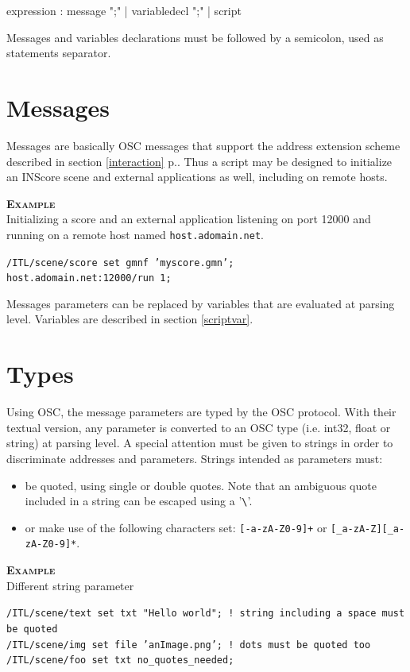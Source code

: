 \documentclass[a4paper,twoside]{report}
\newcommand{\sublevel}[1]	{\section{#1}}
\newcommand{\fullref}[1]	{\ref{#1} p.\pageref{#1}}
\newcommand{\OSC}[1]		{\texttt{#1}}
\newcommand{\example}		{\textbf{\hspace{-1.5cm}\textbf{\textsc{Example }}}}
\newcommand{\sample}	[1]			{\vspace{-2mm}\begin{center}\colorbox{mygrey}{
								\begin{minipage}[t]{0.9\columnwidth} 
								{\small \texttt{#1}}
								\end{minipage}}\end{center}}
\begin{document}
\begin{rail}
expression :  
		 	message ";"
		| 	variabledecl ";"
		| 	script
\end{rail}

Messages and variables declarations must be followed by a semicolon, used as statements separator.

\sublevel{Messages}\label{scriptmsgs}

Messages are basically OSC messages that support the address extension scheme described in section \fullref{interaction}.
Thus a script may be designed to initialize an INScore scene and external applications as well, including on remote hosts.

\example\\
Initializing a score and an external application listening on port 12000 and running on a remote host named \OSC{host.adomain.net}.
\sample{/ITL/scene/score set gmnf 'myscore.gmn';\\
host.adomain.net:12000/run 1;
}

Messages parameters can be replaced by variables that are evaluated at parsing level. Variables are described in section \ref{scriptvar}.

\sublevel{Types}\label{scripttypes}

Using OSC, the message parameters are typed by the OSC protocol. 
With their textual version, any parameter is converted to an OSC type (i.e. int32, float or string) at parsing level.
A special attention must be given to strings in order to discriminate addresses and parameters. Strings intended as parameters must:
\begin{itemize}
\item be quoted, using single or double quotes. Note that an ambiguous quote included in a string can be escaped using a '\verb+\+'.
\item or make use of the following characters set: \OSC{[-a-zA-Z0-9]+} or \OSC{[\_a-zA-Z][\_a-zA-Z0-9]*}.
 \end{itemize}

\example \\
Different string parameter
\sample{/ITL/scene/text set txt "Hello world";  ! string including a space must be quoted \\
/ITL/scene/img set file 'anImage.png';  ! dots must be quoted too \\
/ITL/scene/foo set txt no\_quotes\_needed;
}
\end{document}
